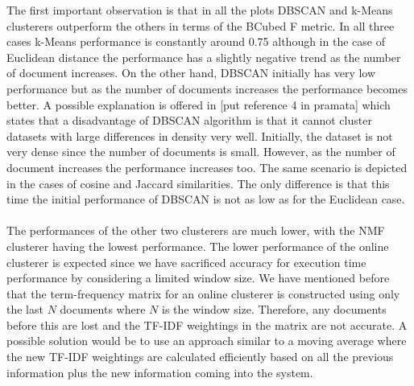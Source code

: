 \noindent The first important observation is that in all the plots DBSCAN and k-Means clusterers outperform the others in terms of the BCubed F metric. In all three cases k-Means performance is constantly around 0.75 although in the case of Euclidean distance the performance has a slightly negative trend as the number of document increases. On the other hand, DBSCAN initially has very low performance but as the number of documents increases the performance becomes better. A possible explanation is offered in [put reference 4 in pramata] which states that a disadvantage of DBSCAN algorithm is that it cannot cluster datasets with large differences in density very well. Initially, the dataset is not very dense since the number of documents is small. However, as the number of document increases the performance increases too. The same scenario is depicted in the cases of cosine and Jaccard similarities. The only difference is that this time the initial performance of DBSCAN is not as low as for the Euclidean case.\\\\
The performances of the other two clusterers are much lower, with the NMF clusterer having the lowest performance. The lower performance of the online clusterer is expected since we have sacrificed accuracy for execution time performance by considering a limited window size. We have mentioned before that the term-frequency matrix for an online clusterer is constructed using only the last $N$ documents where $N$ is the window size. Therefore, any documents before this are lost and the TF-IDF weightings in the matrix are not accurate. A possible solution would be to use an approach similar to a moving average where the new TF-IDF weightings are calculated efficiently based on all the previous information plus the new information coming into the system.   

